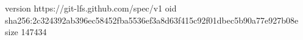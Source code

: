 version https://git-lfs.github.com/spec/v1
oid sha256:2c324392ab396ec58452fba5536ef3a8d63f415c92f01dbec5b90a77e927b08e
size 147434
